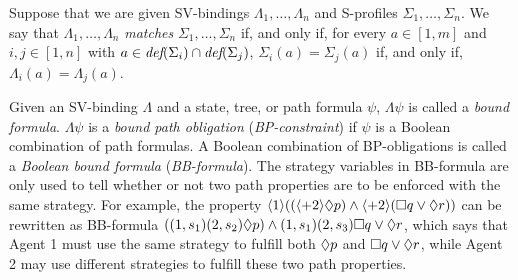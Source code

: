 Suppose that we are given SV-bindings $\Lambda_1,\ldots,\Lambda_n$
and S-profiles $\Sigma_1,\ldots,\Sigma_n$.   
We say that $\Lambda_1,\ldots,\Lambda_n$ {\em matches} 
$\Sigma_1,\ldots,\Sigma_n$ if, and only if, 
for every $a\in[1,m]$ and $i,j\in[1,n]$ 
with $a\in\textit{def}(\Sigma_i)\cap\textit{def}(\Sigma_j)$, 
$\Sigma_i(a)=\Sigma_j(a)$ if, and only if, 
$\Lambda_i(a)=\Lambda_j(a)$.  

Given an SV-binding $\Lambda$ 
and a state, tree, or path formula $\psi$, 
$\Lambda\psi$ is called a {\em bound formula}.  
$\Lambda\psi$ is a {\em bound path obligation} ({\em BP-constraint}) 
if $\psi$ is a Boolean combination of path formulas.  
A Boolean combination of BP-obligations is called a 
{\em Boolean bound formula} ({\em BB-formula}).  
The strategy variables in BB-formula are only used to tell 
whether or not two path properties are to be enforced with the same strategy.  
For example, the property  
$\langle 1\rangle((\langle+ 2\rangle\Diamond p)\wedge 
\langle+ 2\rangle(\Box q\vee\Diamond r))$ 
can be rewritten as BB-formula 
$((1, s_1)(2,s_2)\Diamond p)\wedge 
(1, s_1)(2, s_3)\Box q\vee\Diamond r$, which says that 
Agent 1 must use the same strategy to fulfill  
both $\Diamond p$ and $\Box q\vee\Diamond r$, while 
Agent 2 may use different strategies to fulfill these two path 
properties.  



